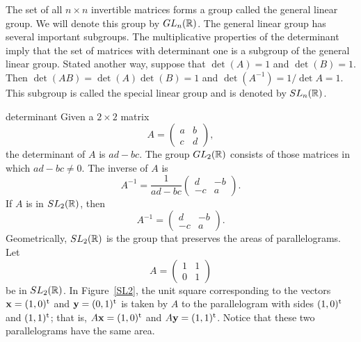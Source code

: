 The set of all $n \times n$  invertible matrices forms a group called
the {\bfi general linear group}.  We will
denote this group by $GL_n({\Bbb R})$.  The general linear group has
several important subgroups. The multiplicative properties of the
determinant imply that the set of matrices with determinant one is a
subgroup of the general linear group.  Stated another way, suppose
that $\det(A) =1$ and $\det(B) = 1$. Then $\det(AB) = \det(A) \det (B)
= 1$ and $\det(A^{-1}) = 1 / \det A = 1$. This subgroup is called the
{\bfi special linear group\/} and is
denoted by $SL_n({\Bbb R})$. 
 
 
\begin{example}{determinant}
Given a $2 \times 2$ matrix
\[
A =
\begin{pmatrix}
a & b \\
c & d
\end{pmatrix},
\]
the determinant of $A$ is \mbox{$ad-bc$}. The group $GL_2({\Bbb R})$
consists of those matrices in which $ad-bc \neq 0$. The inverse of $A$
is 
\[
A^{-1} =
\frac{1}{ad-bc}
\begin{pmatrix}
d & -b \\
-c & a
\end{pmatrix}.
\]
If $A$ is in $SL_2({\Bbb R})$, then
\[
A^{-1} =
\begin{pmatrix}
d & -b \\
-c & a
\end{pmatrix}.
\]
Geometrically, $SL_2({\Bbb R})$ is the group that preserves the areas
of parallelograms.  Let 
\[
A =
\begin{pmatrix}
1 & 1 \\
0 & 1
\end{pmatrix}
\]
be in $SL_2({\Bbb R})$. In Figure~\ref{SL2}, the unit square
corresponding to the vectors ${\bold x} = (1,0)^{\rm t}$ and ${\bold
y} =  (0,1)^{\rm t}$ is taken  by $A$ to the parallelogram with sides
$(1,0)^{\rm t}$ and $(1, 1)^{\rm t}$; that is, $A {\bold x} =
(1,0)^{\rm t}$ and $A {\bold y} = (1, 1)^{\rm t}$. Notice that these
two parallelograms have the same area.   
\end{example}
 
